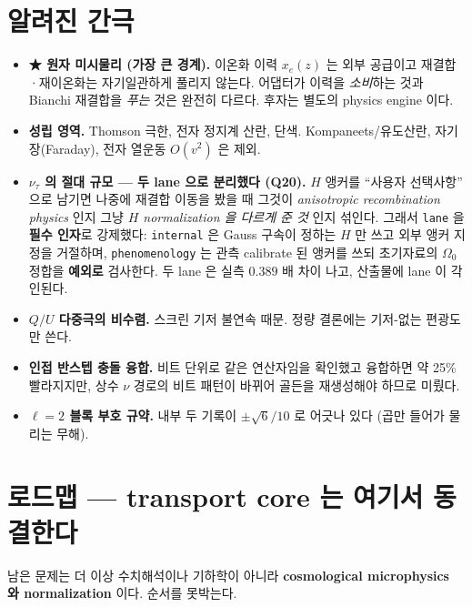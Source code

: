 \documentclass[11pt,a4paper]{article}
\begin{document}
\section{알려진 간극}

\begin{itemize}\itemsep2pt
\item \textbf{★ 원자 미시물리 (가장 큰 경계).} 이온화 이력 $x_e(z)$ 는 외부 공급이고
재결합·재이온화는 자기일관하게 풀리지 않는다.  어댑터가 이력을 \emph{소비}하는 것과
Bianchi 재결합을 \emph{푸는} 것은 완전히 다르다.  후자는 별도의 physics engine 이다.
\item \textbf{성립 영역.} Thomson 극한, 전자 정지계 산란, 단색.
Kompaneets/유도산란, 자기장(Faraday), 전자 열운동 $O(v^2)$ 은 제외.
\item \textbf{$\nu_\tau$ 의 절대 규모 --- 두 lane 으로 분리했다 (Q20).}
$H$ 앵커를 ``사용자 선택사항'' 으로 남기면 나중에 재결합 이동을 봤을 때 그것이
\emph{anisotropic recombination physics} 인지 그냥 \emph{$H$ normalization 을 다르게
준 것} 인지 섞인다.  그래서 \texttt{lane} 을 \textbf{필수 인자}로 강제했다:
\texttt{internal} 은 Gauss 구속이 정하는 $H$ 만 쓰고 외부 앵커 지정을 거절하며,
\texttt{phenomenology} 는 관측 calibrate 된 앵커를 쓰되 초기자료의 $\Omega_0$ 정합을
\textbf{예외로} 검사한다.  두 lane 은 실측 $0.389$ 배 차이 나고, 산출물에 lane 이
각인된다.
\item \textbf{$Q/U$ 다중극의 비수렴.} 스크린 기저 불연속 때문. 정량 결론에는
기저-없는 편광도만 쓴다.
\item \textbf{인접 반스텝 충돌 융합.} 비트 단위로 같은 연산자임을 확인했고 융합하면
약 25\% 빨라지지만, 상수 $\nu$ 경로의 비트 패턴이 바뀌어 골든을 재생성해야 하므로
미뤘다.
\item \textbf{$\ell=2$ 블록 부호 규약.} 내부 두 기록이 $\pm\sqrt6/10$ 로 어긋나 있다
(곱만 들어가 물리는 무해).
\end{itemize}


\section{로드맵 --- transport core 는 여기서 동결한다}

남은 문제는 더 이상 수치해석이나 기하학이 아니라 \textbf{cosmological microphysics
와 normalization} 이다.  순서를 못박는다.
\end{document}
